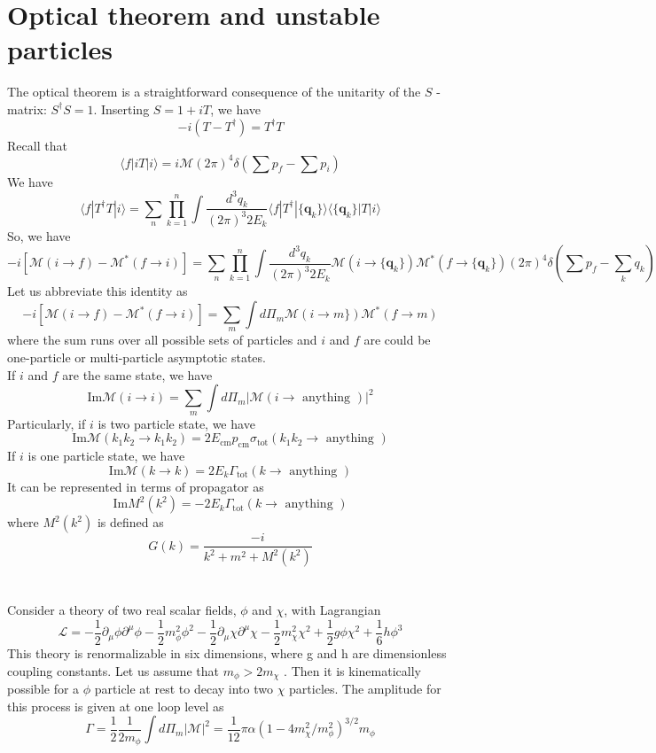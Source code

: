 \documentclass[cyan]{elegantnote}
\begin{document}
\section{Optical theorem and unstable particles}
The optical theorem is a straightforward consequence of the unitarity of the $S$ -matrix: $S^{\dagger}S = 1$. 
Inserting $S = 1 + iT$, we have
\[-i(T - T^{\dagger}) = T^{\dagger}T\]
Recall that
\[\langle f | iT | i \rangle = i\mathcal{M}(2\pi)^4\delta(\sum p_f - \sum p_i)\]
We have
\[\langle f | T^{\dagger}T | i \rangle = \sum_n \prod_{k=1}^n \int \frac{d^3q_k}{(2\pi)^3 2E_k} \langle f | T^{\dagger} | \{\bm{q}_k\} \rangle \langle \{\bm{q}_k\} | T | i \rangle\]
So, we have
\[-i[\mathcal{M}(i \to f) - \mathcal{M}^{*}(f \to i)] =  \sum_n \prod_{k=1}^n \int \frac{d^3q_k}{(2\pi)^3 2E_k} \mathcal{M}(i \to \{\bm{q}_k\}) \mathcal{M}^{*}(f \to \{\bm{q}_k\}) (2\pi)^4 \delta(\sum p_f- \sum_k q_k)\]
Let us abbreviate this identity as
\[-i[\mathcal{M}(i \to f) - \mathcal{M}^{*}(f \to i)] = \sum_m \int d\Pi_{m} \mathcal{M}(i \to m\}) \mathcal{M}^{*}(f \to m)\]
where the sum runs over all possible sets of particles and $i$ and $f$ are could be one-particle or multi-particle asymptotic states.
\\
If $i$ and $f$ are the same state, we have
\[\mathrm{Im} \mathcal{M}(i \to i) = \sum_m \int d\Pi_{m} |\mathcal{M}(i \to \mbox{ anything })|^2\]
Particularly, if $i$ is two particle state, we have
\[\mathrm{Im} \mathcal{M}(k_1k_2 \to k_1k_2) = 2E_{\mathrm{cm}}p_{\mathrm{cm}}\sigma_{\mathrm{tot}}(k_1k_2 \to \mbox{ anything })\]
If $i$ is one particle state, we have
\[\mathrm{Im} \mathcal{M}(k \to k) = 2E_{k}\Gamma_{\mathrm{tot}}(k \to \mbox{ anything })\]
It can be represented in terms of propagator as
\[\mathrm{Im} M^2(k^2) = -2E_{k}\Gamma_{\mathrm{tot}}(k \to \mbox{ anything })\]
where $M^2(k^2)$ is defined as
\[G(k) = \frac{-i}{k^2+m^2+M^2(k^2)}\]
\\ \\
Consider a theory of two real scalar fields, $\phi$ and $\chi$, with Lagrangian
\[\mathcal{L} = -\frac{1}{2}\partial_{\mu}\phi \partial^{\mu}\phi - \frac{1}{2}m_{\phi}^2\phi^2 -\frac{1}{2}\partial_{\mu}\chi \partial^{\mu}\chi - \frac{1}{2}m_{\chi}^2\chi^2 + \frac{1}{2}g\phi\chi^2 + \frac{1}{6}h\phi^3\]
This theory is renormalizable in six dimensions, where g and h are dimensionless coupling constants. Let us assume that $m_{\phi} > 2m_{\chi}$ . Then it is kinematically possible for a $\phi$ particle at rest to decay into two $\chi$ particles.
The amplitude for this process is given at one loop level as
\[\Gamma = \frac{1}{2} \frac{1}{2m_{\phi}} \int d\Pi_m |\mathcal{M}|^2 = \frac{1}{12} \pi \alpha (1 - 4m_{\chi}^2/m_{\phi}^2)^{3/2}m_{\phi}\]
\end{document}
